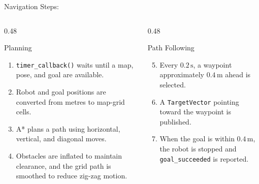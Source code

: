 \documentclass[aspectratio=169, 11pt]{beamer}
\begin{document}
\begin{frame}{Navigation Steps:}
  \small
  \begin{columns}[T]
    \begin{column}{0.48\textwidth}
      \begin{block}{Planning}
        \begin{enumerate}
          \item \texttt{timer\_callback()} waits until a map, pose, and goal are available.
          \item Robot and goal positions are converted from metres to map-grid cells.
          \item A* plans a path using horizontal, vertical, and diagonal moves.
          \item Obstacles are inflated to maintain clearance, and the grid path is smoothed to reduce zig-zag motion.
        \end{enumerate}
      \end{block}
    \end{column}

    \begin{column}{0.48\textwidth}
      \begin{block}{Path Following}
        \begin{enumerate}
          \setcounter{enumi}{4}
          \item Every $0.2\,\mathrm{s}$, a waypoint approximately $0.4\,\mathrm{m}$ ahead is selected.
          \item A \texttt{TargetVector} pointing toward the waypoint is published.
          \item When the goal is within $0.4\,\mathrm{m}$, the robot is stopped and \texttt{goal\_succeeded} is reported.
        \end{enumerate}
      \end{block}
    \end{column}
  \end{columns}
\end{frame}
\end{document}
